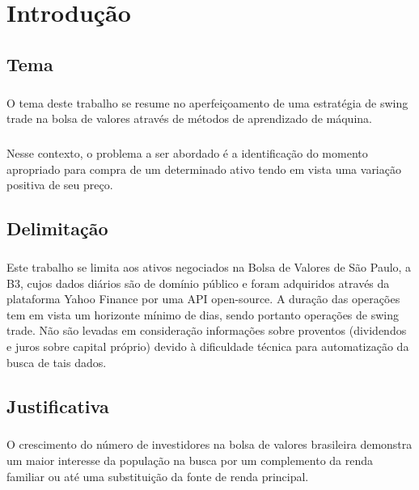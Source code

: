 \chapter{Introdução}
\label{cap1}

\section{Tema}

\paragraph{} O tema deste trabalho se resume no aperfeiçoamento de uma estratégia de swing trade na bolsa de valores através de métodos de aprendizado de máquina.

\paragraph{} Nesse contexto, o problema a ser abordado é a identificação do momento apropriado para compra de um determinado ativo tendo em vista uma variação positiva de seu preço.


\section{Delimitação}

\paragraph{} Este trabalho se limita aos ativos negociados na Bolsa de Valores de São Paulo, a B3, cujos dados diários são de domínio público e foram adquiridos através da plataforma Yahoo Finance por uma API open-source. A duração das operações tem em vista um horizonte mínimo de dias, sendo portanto operações de swing trade. Não são levadas em consideração informações sobre proventos (dividendos e juros sobre capital próprio) devido à dificuldade técnica para automatização da busca de tais dados.

\section{Justificativa}

\paragraph{} O crescimento do número de investidores na bolsa de valores brasileira\cite{aumento_investidores} demonstra um maior interesse da população na busca por um complemento da renda familiar ou até uma substituição da fonte de renda principal.

